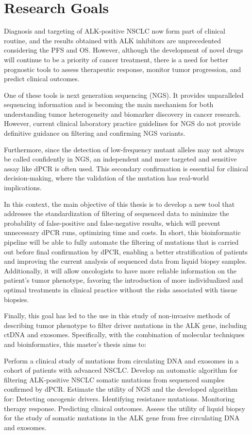 \chapter{Research Goals}

Diagnosis and targeting of ALK-positive NSCLC now form part of clinical routine, and the results obtained with ALK inhibitors are unprecedented considering the PFS and OS. However, although the development of novel drugs will continue to be a priority of cancer treatment, there is a need for better prognostic tools to assess therapeutic response, monitor tumor progression, and predict clinical outcomes.

One of these tools is next generation sequencing (NGS). It provides unparalleled sequencing information and is becoming the main mechanism for both understanding tumor heterogeneity and biomarker discovery in cancer research. However, current clinical laboratory practice guidelines for NGS do not provide definitive guidance on filtering and confirming NGS variants.

Furthermore, since the detection of low-frequency mutant alleles may not always be called confidently in NGS, an independent and more targeted and sensitive assay like dPCR is often used. This secondary confirmation is essential for clinical decision-making, where the validation of the mutation has real-world implications.

In this context, the main objective of this thesis is to develop a new tool that addresses the standardization of filtering of sequenced data to minimize the probability of false-positive and false-negative results, which will prevent unnecessary dPCR runs, optimizing time and costs. In short, this bioinformatic pipeline will be able to fully automate the filtering of mutations that is carried out before final confirmation by dPCR, enabling a better stratification of patients and improving the current analysis of sequenced data from liquid biopsy samples. Additionally, it will allow oncologists to have more reliable information on the patient's tumor phenotype, favoring the introduction of more individualized and optimal treatments in clinical practice without the risks associated with tissue biopsies.

Finally, this goal has led to the use in this study of non-invasive methods of describing tumor phenotype to filter driver mutations in the ALK gene, including ctDNA and exosomes. Specifically, with the combination of molecular techniques and bioinformatics, this master's thesis aims to:
\begin{outline}
    \1 Perform a clinical study of mutations from circulating DNA and exosomes in a cohort of patients with advanced NSCLC.
    \1 Develop an automatic algorithm for filtering ALK-positive NSCLC somatic mutations from sequenced samples confirmed by dPCR.
    \1 Estimate the utility of NGS and the developed algorithm for:
        \2 Detecting oncogenic drivers.
        \2 Identifying resistance mutations.
        \2 Monitoring therapy response.
        \2 Predicting clinical outcomes.
    \1 Assess the utility of liquid biopsy for the study of somatic mutations in the ALK gene from free circulating DNA and exosomes.
\end{outline}